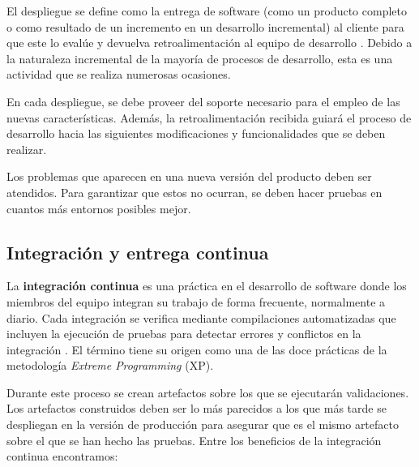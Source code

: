\documentclass[11pt,spanish,listoffigures]{tfgetsinf}
\begin{document}
El despliegue se define como la entrega de software (como un producto completo o como resultado de un incremento en un desarrollo incremental) al cliente para que este lo evalúe y devuelva retroalimentación al equipo de desarrollo \cite{Pressman}. Debido a la naturaleza incremental de la mayoría de procesos de desarrollo, esta es una actividad que se realiza numerosas ocasiones. 

En cada despliegue, se debe proveer del soporte necesario para el empleo de las nuevas características. Además, la retroalimentación recibida guiará el proceso de desarrollo hacia las siguientes modificaciones y funcionalidades que se deben realizar.

Los problemas que aparecen en una nueva versión del producto deben ser atendidos. Para garantizar que estos no ocurran, se deben hacer pruebas en cuantos más entornos posibles mejor.

\subsection{Integración y entrega continua}

La \textbf{integración continua} es una práctica en el desarrollo de software donde los miembros del equipo integran su trabajo de forma frecuente, normalmente a diario. Cada integración se verifica mediante compilaciones automatizadas que incluyen la ejecución de pruebas para detectar errores y conflictos en la integración \cite{Fowler2006}. El término tiene su origen como una de las doce prácticas de la metodología \textit{Extreme Programming} (XP).

Durante este proceso se crean artefactos sobre los que se ejecutarán validaciones. Los artefactos construidos deben ser lo más parecidos a los que más tarde se despliegan en la versión de producción para asegurar que es el mismo artefacto sobre el que se han hecho las pruebas. Entre los beneficios de la integración continua encontramos:
 
\end{document}
